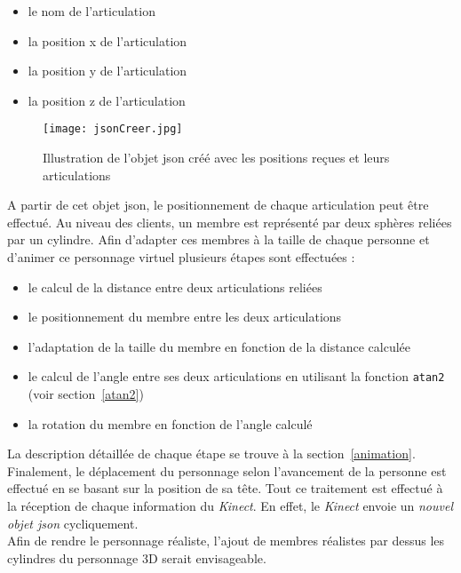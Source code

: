 \begin{itemize}
\item le nom de l'articulation
\item la position x de l'articulation
\item la position y de l'articulation
\item la position z de l'articulation
\end{itemize}

\begin{figure}[H]
\centering
\texttt{[image: jsonCreer.jpg]}
\caption{\label{jsonrecu} Illustration de l'objet json créé avec les positions reçues et leurs articulations}
\end{figure}

A partir de cet \textsf{objet json}, le positionnement de chaque articulation peut être effectué. Au niveau des clients, un membre est représenté par deux sphères reliées par un cylindre. Afin d'adapter ces membres à la taille de chaque personne et d'animer ce personnage virtuel plusieurs étapes sont effectuées : 

\begin{itemize}
\item le calcul de la distance entre deux articulations reliées
\item le positionnement du membre entre les deux articulations
\item l'adaptation de la taille du membre en fonction de la distance calculée
\item le calcul de l'angle entre ses deux articulations en utilisant la fonction \texttt{atan2} (voir section~\ref{atan2})
\item la rotation du membre en fonction de l'angle calculé \\

\end{itemize} 
La description détaillée de chaque étape se trouve à la section~\ref{animation}. \\

Finalement, le déplacement du personnage selon l'avancement de la personne est effectué en se basant sur la position de sa tête. Tout ce traitement est effectué à la réception de chaque information du \textit{Kinect}. En effet, le \textit{Kinect} envoie un \textit{nouvel objet json} cycliquement.\\
Afin de rendre le personnage réaliste, l'ajout de membres réalistes par dessus les cylindres du personnage 3D serait envisageable. 

\pagebreak
